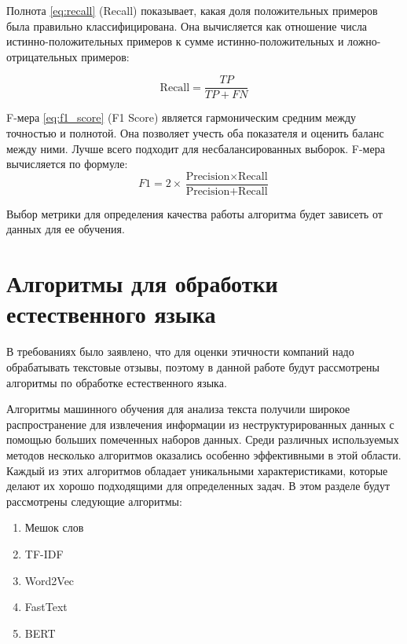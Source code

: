 \documentclass[PI, VKR]{HSEUniversity}
\begin{document}
Полнота \ref{eq:recall} (Recall) показывает, какая доля положительных примеров была правильно классифицирована. Она вычисляется как отношение числа истинно-положительных примеров к сумме истинно-положительных и ложно-отрицательных примеров:

\begin{equation}
\label{eq:recall}
  \text{{Recall}} = \frac{{TP}}{{TP + FN}}
\end{equation}

F-мера \ref{eq:f1_score} (F1 Score) является гармоническим средним между точностью и полнотой. Она позволяет учесть оба показателя и оценить баланс между ними. Лучше всего подходит для несбалансированных выборок. F-мера вычисляется по формуле:
\begin{equation}
\label{eq:f1_score}
F1 = 2 \times \frac{{\text{{Precision}} \times \text{{Recall}}}}{{\text{{Precision}} + \text{{Recall}}}}
\end{equation}

Выбор метрики для определения качества работы алгоритма будет зависеть от данных для ее обучения.
\section{Алгоритмы для обработки естественного языка}
\label{sec:org82fa823}
В требованиях было заявлено, что для оценки этичности компаний надо обрабатывать текстовые отзывы, поэтому в данной работе будут рассмотрены алгоритмы по обработке естественного языка.

Алгоритмы машинного обучения для анализа текста получили широкое распространение для извлечения информации из неструктурированных данных с помощью больших помеченных наборов данных. Среди различных используемых методов несколько алгоритмов оказались особенно эффективными в этой области. Каждый из этих алгоритмов обладает уникальными характеристиками, которые делают их хорошо подходящими для определенных задач. В этом разделе будут рассмотрены следующие алгоритмы:
\begin{enumerate}
\item Мешок слов
\item TF-IDF
\item Word2Vec
\item FastText
\item BERT
\end{enumerate}
\end{document}
